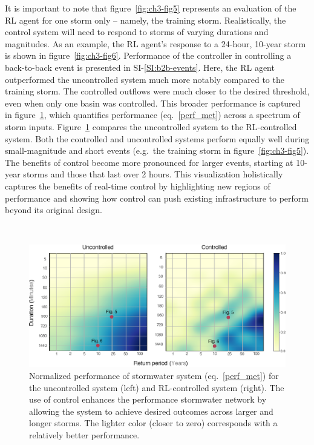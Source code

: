 It is important to note that figure~\ref{fig:ch3-fig5} represents an evaluation of the RL agent for one storm only – namely, the training storm.
Realistically, the control system will need to respond to storms of varying durations and magnitudes.
As an example, the RL agent’s response to a 24-hour, 10-year storm is shown in figure~\ref{fig:ch3-fig6}.
Performance of the controller in controlling a back-to-back event is presented in SI-\ref{SI:b2b-events}.
Here, the RL agent outperformed the uncontrolled system much more notably compared to the training storm.
The controlled outflows were much closer to the desired threshold, even when only one basin was controlled.
This broader performance is captured in figure~\ref{fig:ch3-fig7}, which quantifies performance (eq.~\ref{perf_met}) across a spectrum of storm inputs.
Figure~\ref{fig:ch3-fig7} compares the uncontrolled system to the RL-controlled system.
Both the controlled  and uncontrolled systems perform equally well during small-magnitude and short events (e.g.\ the training storm in figure~\ref{fig:ch3-fig5}).
The benefits of control become more pronounced for larger events, starting at 10-year storms and those that last over 2 hours.
This visualization holistically captures the benefits of real-time control by highlighting new regions of performance and showing how control can push existing infrastructure to perform beyond its original design.

\

\begin{figure}
    \centering
    \includegraphics[width=\linewidth]{gfx/Chapter-3/heatmap.eps}
    \caption{Normalized performance of stormwater system (eq.~\ref{perf_met}) for the uncontrolled system (left) and RL-controlled system (right). The use of control enhances the performance stormwater network by allowing the system to achieve desired outcomes across larger and longer storms. The lighter color (closer to zero) corresponds with a relatively better performance.}\label{fig:ch3-fig7}
\end{figure}


